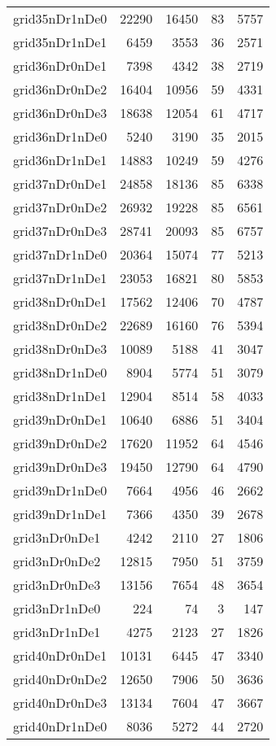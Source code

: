 \begin{tabular}{lrrrr}
grid35nDr1nDe0 & 22290 & 16450 & 83 & 5757 \\
grid35nDr1nDe1 & 6459 & 3553 & 36 & 2571 \\
grid36nDr0nDe1 & 7398 & 4342 & 38 & 2719 \\
grid36nDr0nDe2 & 16404 & 10956 & 59 & 4331 \\
grid36nDr0nDe3 & 18638 & 12054 & 61 & 4717 \\
grid36nDr1nDe0 & 5240 & 3190 & 35 & 2015 \\
grid36nDr1nDe1 & 14883 & 10249 & 59 & 4276 \\
grid37nDr0nDe1 & 24858 & 18136 & 85 & 6338 \\
grid37nDr0nDe2 & 26932 & 19228 & 85 & 6561 \\
grid37nDr0nDe3 & 28741 & 20093 & 85 & 6757 \\
grid37nDr1nDe0 & 20364 & 15074 & 77 & 5213 \\
grid37nDr1nDe1 & 23053 & 16821 & 80 & 5853 \\
grid38nDr0nDe1 & 17562 & 12406 & 70 & 4787 \\
grid38nDr0nDe2 & 22689 & 16160 & 76 & 5394 \\
grid38nDr0nDe3 & 10089 & 5188 & 41 & 3047 \\
grid38nDr1nDe0 & 8904 & 5774 & 51 & 3079 \\
grid38nDr1nDe1 & 12904 & 8514 & 58 & 4033 \\
grid39nDr0nDe1 & 10640 & 6886 & 51 & 3404 \\
grid39nDr0nDe2 & 17620 & 11952 & 64 & 4546 \\
grid39nDr0nDe3 & 19450 & 12790 & 64 & 4790 \\
grid39nDr1nDe0 & 7664 & 4956 & 46 & 2662 \\
grid39nDr1nDe1 & 7366 & 4350 & 39 & 2678 \\
grid3nDr0nDe1 & 4242 & 2110 & 27 & 1806 \\
grid3nDr0nDe2 & 12815 & 7950 & 51 & 3759 \\
grid3nDr0nDe3 & 13156 & 7654 & 48 & 3654 \\
grid3nDr1nDe0 & 224 & 74 & 3 & 147 \\
grid3nDr1nDe1 & 4275 & 2123 & 27 & 1826 \\
grid40nDr0nDe1 & 10131 & 6445 & 47 & 3340 \\
grid40nDr0nDe2 & 12650 & 7906 & 50 & 3636 \\
grid40nDr0nDe3 & 13134 & 7604 & 47 & 3667 \\
grid40nDr1nDe0 & 8036 & 5272 & 44 & 2720 \\

\end{tabular}

